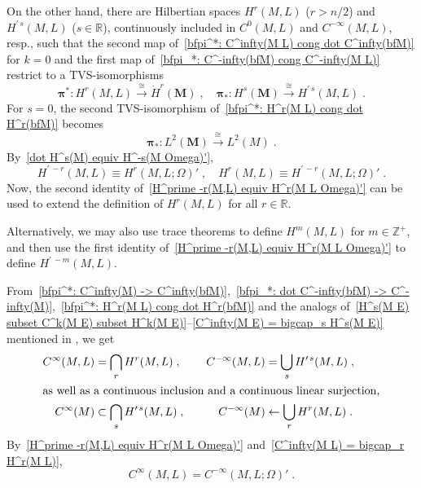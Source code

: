 \documentclass{memo-l}
\theoremstyle{plain}
\theoremstyle{definition}
\theoremstyle{remark}
\newcommand{\R}{\mathbb{R}}
\newcommand{\Z}{\mathbb{Z}}
\newcommand{\bfM}{\boldsymbol{M}}
\newcommand{\bfpi}{\boldsymbol{\pi}}
\numberwithin{section}{chapter}
\numberwithin{equation}{section}%
\begin{document}
On the other hand, there are Hilbertian spaces $H^r(M,L)$ ($r>n/2$)  and $H^{\prime\,s}(M,L)$ ($s\in\R$),  continuously included in $C^0(M,L)$ and $C^{-\infty}(M,L)$, resp., such that the second map of~\eqref{bfpi^*: C^infty(M L) cong dot C^infty(bfM)} for $k=0$ and the first map of~\eqref{bfpi_*: C^-infty(bfM) cong C^-infty(M L)} restrict to a TVS-isomorphisms
\begin{equation}\label{bfpi^*: H^r(M L) cong dot H^r(bfM)}
\bfpi^*:H^r(M,L)\xrightarrow{\cong}\dot H^r(\bfM)\;,\quad
\bfpi_*:H^s(\bfM)\xrightarrow{\cong}H^{\prime\,s}(M,L)\;.
\end{equation}
For $s=0$, the second TVS-isomorphism of~\eqref{bfpi^*: H^r(M L) cong dot H^r(bfM)} becomes
\begin{equation}\label{bfpi_*: L^2(bfM) cong L^2(M)}
\bfpi_*:L^2(\bfM)\xrightarrow{\cong}L^2(M)\;.
\end{equation}
By~\eqref{dot H^s(M) equiv H^-s(M Omega)'},
\begin{equation}\label{H^prime -r(M,L) equiv H^r(M L Omega)'}
H^{\prime\,-r}(M,L)\equiv H^r(M,L;\Omega)'\;,\quad H^r(M,L)\equiv H^{\prime\,-r}(M,L;\Omega)'\;.
\end{equation}
Now, the second identity of~\eqref{H^prime -r(M,L) equiv H^r(M L Omega)'} can be used to extend the definition of $H^r(M,L)$ for all $r\in\R$.

Alternatively, we may also use trace theorems \cite[Theorem~7.53 and~7.58]{Adams1975} to define $H^m(M,L)$ for $m\in\Z^+$, and then use the first identity of~\eqref{H^prime -r(M,L) equiv H^r(M L Omega)'} to define $H^{\prime\,-m}(M,L)$.

From~\eqref{bfpi^*: C^infty(M) -> C^infty(bfM)},~\eqref{bfpi_*: dot C^-infty(bfM) -> C^-infty(M)},~\eqref{bfpi^*: H^r(M L) cong dot H^r(bfM)} and the analogs of~\eqref{H^s(M E) subset C^k(M E) subset H^k(M E)}--\eqref{C^infty(M E) = bigcap_s H^s(M E)} mentioned in , we get
\begin{alignat}{2}
C^\infty(M,L)&=\bigcap_rH^r(M,L)\;,&\quad C^{-\infty}(M,L)&=\bigcup_sH^{\prime\,s}(M,L)\;,
\label{C^infty(M L) = bigcap_r H^r(M L)}\\
\intertext{as well as a continuous inclusion and a continuous linear surjection,}
C^\infty(M)&\subset\bigcap_sH^{\prime\,s}(M,L)\;,&\quad C^{-\infty}(M)&\leftarrow\bigcup_rH^r(M,L)\;.
\label{C^infty(M) subset bigcap_sH^prime s(M L)}
\end{alignat}
By~\eqref{H^prime -r(M,L) equiv H^r(M L Omega)'} and~\eqref{C^infty(M L) = bigcap_r H^r(M L)},
\begin{equation}\label{C^infty(M L) = C^-infty(M L Omega)'}
C^\infty(M,L)=C^{-\infty}(M,L;\Omega)'\;.
\end{equation}
\end{document}
